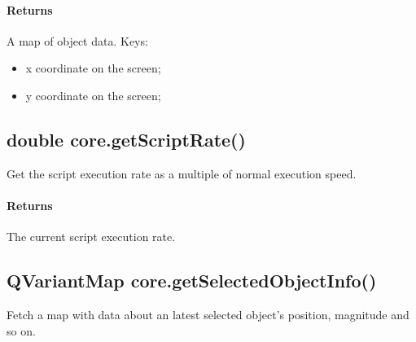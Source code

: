 \paragraph{Returns}
A map of object data. Keys:
\begin{itemize}
\item {} x coordinate on the screen;
\item {} y coordinate on the screen;
\end{itemize}

\subsection{double core.getScriptRate()}
\label{sec:ScriptingAPI:core:getScriptRate}
Get the script execution rate as a multiple of normal execution speed.

\paragraph{Returns}
The current script execution rate.

\subsection{QVariantMap core.getSelectedObjectInfo()}
\label{sec:ScriptingAPI:core:getSelectedObjectInfo}
Fetch a map with data about an latest selected object's position, magnitude and so on.
